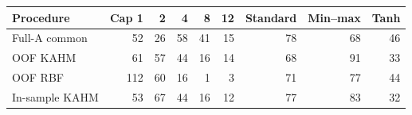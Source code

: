 \begin{tabular}{@{}lrrrrrrrr@{}}
\toprule
Procedure & Cap 1 & 2 & 4 & 8 & 12 & Standard & Min--max & Tanh \\
\midrule
Full-A common & 52 & 26 & 58 & 41 & 15 & 78 & 68 & 46 \\
OOF KAHM & 61 & 57 & 44 & 16 & 14 & 68 & 91 & 33 \\
OOF RBF & 112 & 60 & 16 & 1 & 3 & 71 & 77 & 44 \\
In-sample KAHM & 53 & 67 & 44 & 16 & 12 & 77 & 83 & 32 \\
\bottomrule
\end{tabular}

